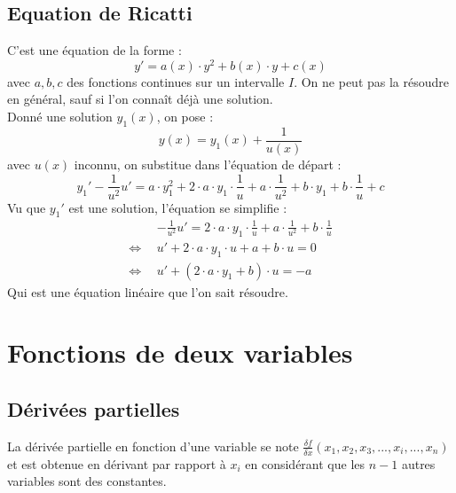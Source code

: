 \documentclass[12pt,a4paper]{report}
\begin{document}
\section{Equation de Ricatti}

C'est une équation de la forme :
$$y'=a(x)\cdot y^2 + b(x) \cdot y+c(x)$$
avec $a,b,c$ des fonctions continues sur un intervalle $I$.
On ne peut pas la résoudre en général, sauf si l'on connaît déjà une solution.\\
Donné une solution $y_1(x)$, on pose :
$$y(x)=y_1(x)+\frac{1}{u(x)}$$
avec $u(x)$ inconnu, on substitue dans l'équation de départ :
$$y_1'-\frac{1}{u^2}u'=a\cdot y_1^2 + 2\cdot a \cdot y_1 \cdot \frac{1}{u} + a \cdot \frac{1}{u^2} + b\cdot y_1 + b\cdot \frac{1}{u} + c$$
Vu que $y_1'$ est une solution, l'équation se simplifie :
\begin{align*}
&-\frac{1}{u^2}u'=2\cdot a \cdot y_1 \cdot \frac{1}{u} + a \cdot \frac{1}{u^2} + b\cdot \frac{1}{u} \tag*{On multiplie par $u^2$}\\
\Leftrightarrow\ \ &u'+2\cdot a \cdot y_1 \cdot u + a + b \cdot u = 0\\
\Leftrightarrow\ \ &u'+(2\cdot a \cdot y_1 + b)\cdot u = -a
\end{align*}
Qui est une équation linéaire que l'on sait résoudre.
%
%
%
%
%

\chapter{Fonctions de deux variables}

\section{Dérivées partielles}

La dérivée partielle en fonction d'une variable se note $\frac{\delta f}{\delta x}(x_1,x_2,x_3,...,x_i,...,x_n)$ et est obtenue en dérivant par rapport à $x_i$ en considérant que les $n-1$ autres variables sont des constantes.\\
\end{document}
